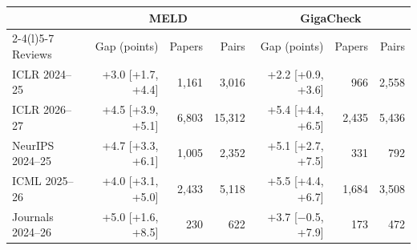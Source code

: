 \begin{tabular}{@{}lrrrrrr@{}}
\toprule
 & \multicolumn{3}{c}{MELD} & \multicolumn{3}{c}{GigaCheck} \\
\cmidrule(lr){2-4}\cmidrule(l){5-7}
Reviews & Gap (points) & Papers & Pairs & Gap (points) & Papers & Pairs \\
\midrule
ICLR 2024--25 & +3.0 [+1.7, +4.4] & 1,161 & 3,016 & +2.2 [+0.9, +3.6] & 966 & 2,558 \\
ICLR 2026--27 & +4.5 [+3.9, +5.1] & 6,803 & 15,312 & +5.4 [+4.4, +6.5] & 2,435 & 5,436 \\
NeurIPS 2024--25 & +4.7 [+3.3, +6.1] & 1,005 & 2,352 & +5.1 [+2.7, +7.5] & 331 & 792 \\
ICML 2025--26 & +4.0 [+3.1, +5.0] & 2,433 & 5,118 & +5.5 [+4.4, +6.7] & 1,684 & 3,508 \\
Journals 2024--26 & +5.0 [+1.6, +8.5] & 230 & 622 & +3.7 [$-$0.5, +7.9] & 173 & 472 \\
\bottomrule
\end{tabular}

